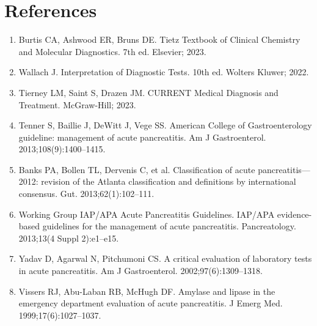 \section*{References}
\begin{enumerate}
  \item Burtis CA, Ashwood ER, Bruns DE. Tietz Textbook of Clinical Chemistry and Molecular Diagnostics. 7th ed. Elsevier; 2023.
  \item Wallach J. Interpretation of Diagnostic Tests. 10th ed. Wolters Kluwer; 2022.
  \item Tierney LM, Saint S, Drazen JM. CURRENT Medical Diagnosis and Treatment. McGraw-Hill; 2023.
  \item Tenner S, Baillie J, DeWitt J, Vege SS. American College of Gastroenterology guideline: management of acute pancreatitis. Am J Gastroenterol. 2013;108(9):1400--1415.
  \item Banks PA, Bollen TL, Dervenis C, et al. Classification of acute pancreatitis---2012: revision of the Atlanta classification and definitions by international consensus. Gut. 2013;62(1):102--111.
  \item Working Group IAP/APA Acute Pancreatitis Guidelines. IAP/APA evidence-based guidelines for the management of acute pancreatitis. Pancreatology. 2013;13(4 Suppl 2):e1--e15.
  \item Yadav D, Agarwal N, Pitchumoni CS. A critical evaluation of laboratory tests in acute pancreatitis. Am J Gastroenterol. 2002;97(6):1309--1318.
  \item Vissers RJ, Abu-Laban RB, McHugh DF. Amylase and lipase in the emergency department evaluation of acute pancreatitis. J Emerg Med. 1999;17(6):1027--1037.
\end{enumerate}

\clearpage
